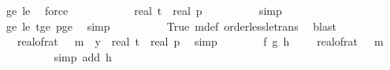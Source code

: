 \begin{isabellebody}
\ {\isasymdelta}{\isacharprime}{\kern0pt}{\isacharunderscore}{\kern0pt}ge{\isacharunderscore}{\kern0pt}{}\ {\isasymdelta}{\isacharprime}{\kern0pt}{\isacharunderscore}{\kern0pt}le{\isacharunderscore}{\kern0pt}{}\ \isamarkupfalse%
\ force\isanewline
\ \ \ \ \ \ \isamarkupfalse%
\ \isamarkupfalse%
\ {\isachardoublequoteopen}{\isachardot}{\kern0pt}{\isachardot}{\kern0pt}{\isachardot}{\kern0pt}\ {\isacharequal}{\kern0pt}\ real\ t\ {\isacharasterisk}{\kern0pt}\ real\ p{\isachardoublequoteclose}\isanewline
\ \ \ \ \ \ \ \ \isamarkupfalse%
\ {\isacharparenleft}{\kern0pt}simp{\isacharparenright}{\kern0pt}\isanewline
\ \ \ \ \ \ \ \ \isamarkupfalse%
\ {\isasymdelta}{\isacharprime}{\kern0pt}{\isacharunderscore}{\kern0pt}ge{\isacharunderscore}{\kern0pt}{}\ {\isasymdelta}{\isacharprime}{\kern0pt}{\isacharunderscore}{\kern0pt}le{\isacharunderscore}{\kern0pt}{}\ t{\isacharunderscore}{\kern0pt}ge{\isacharunderscore}{\kern0pt}{}\ p{\isacharunderscore}{\kern0pt}ge{\isacharunderscore}{\kern0pt}{}\ \isamarkupfalse%
\ simp\isanewline
\ \ \ \ \ \ \ \ \isamarkupfalse%
\ True\ m{\isacharunderscore}{\kern0pt}def\ order{\isacharunderscore}{\kern0pt}less{\isacharunderscore}{\kern0pt}le{\isacharunderscore}{\kern0pt}trans\ \isamarkupfalse%
\ blast\isanewline
\ \ \ \ \ \ \isamarkupfalse%
\ \isamarkupfalse%
\ {\isachardoublequoteopen}{\isacharparenleft}{\kern0pt}{}\ {\isacharminus}{\kern0pt}\ real{\isacharunderscore}{\kern0pt}of{\isacharunderscore}{\kern0pt}rat\ {\isasymdelta}{\isacharparenright}{\kern0pt}\ {\isacharasterisk}{\kern0pt}\ m\ {\isacharasterisk}{\kern0pt}\ y{\isacharprime}{\kern0pt}\ {\isacharless}{\kern0pt}\ real\ t\ {\isacharasterisk}{\kern0pt}\ real\ p{\isachardoublequoteclose}\ \isamarkupfalse%
\ simp\isanewline
\ \ \ \ \ \ \isamarkupfalse%
\ f{\isacharunderscore}{\kern0pt}{}{\isacharcolon}{\kern0pt}\ {\isachardoublequoteopen}g{\isacharprime}{\kern0pt}\ {\isacharparenleft}{\kern0pt}h\ {\isasymomega}{\isacharparenright}{\kern0pt}\ {\isachargreater}{\kern0pt}\ {\isacharparenleft}{\kern0pt}{}\ {\isacharminus}{\kern0pt}\ real{\isacharunderscore}{\kern0pt}of{\isacharunderscore}{\kern0pt}rat\ {\isasymdelta}{\isacharparenright}{\kern0pt}\ {\isacharasterisk}{\kern0pt}\ m{\isachardoublequoteclose}\isanewline
\ \ \ \ \ \ \ \ \isamarkupfalse%
\ {\isacharparenleft}{\kern0pt}simp\ add{\isacharcolon}{\kern0pt}\ h{\isacharunderscore}{\kern0pt}{}{\isacharparenright}{\kern0pt}\isanewline

\end{isabellebody}
